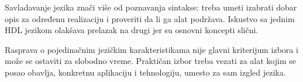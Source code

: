 Savladavanje jezika znači više od poznavanja sintakse: treba umeti izabrati dobar opis za određenu realizaciju i proveriti da li ga alat podržava. Iskustvo sa jednim HDL jezikom olakšava prelazak na drugi jer su osnovni koncepti slični.

Rasprava o pojedinačnim jezičkim karakteristikama nije glavni kriterijum izbora i može se ostaviti za slobodno vreme. Praktičan izbor treba vezati za alat kojim se posao obavlja, konkretnu aplikaciju i tehnologiju, umesto za sam izgled jezika.
